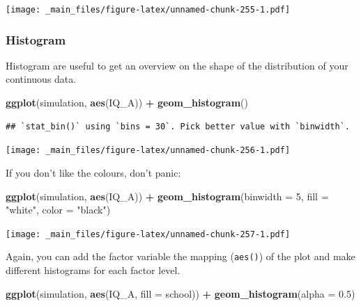 \documentclass[
]{scrartcl}
\newenvironment{Shaded}{\begin{snugshade}}{\end{snugshade}}
\newcommand{\DataTypeTok}[1]{\textcolor[rgb]{0.13,0.29,0.53}{#1}}
\newcommand{\DecValTok}[1]{\textcolor[rgb]{0.00,0.00,0.81}{#1}}
\newcommand{\FloatTok}[1]{\textcolor[rgb]{0.00,0.00,0.81}{#1}}
\newcommand{\KeywordTok}[1]{\textcolor[rgb]{0.13,0.29,0.53}{\textbf{#1}}}
\newcommand{\NormalTok}[1]{#1}
\newcommand{\OperatorTok}[1]{\textcolor[rgb]{0.81,0.36,0.00}{\textbf{#1}}}
\newcommand{\StringTok}[1]{\textcolor[rgb]{0.31,0.60,0.02}{#1}}
\begin{document}
\texttt{[image: \_main\_files/figure-latex/unnamed-chunk-255-1.pdf]}

\hypertarget{histogram}{%
\subsubsection{Histogram}\label{histogram}}

Histogram are useful to get an overview on the shape of the distribution of your continuous data.

\begin{Shaded}
\begin{Highlighting}[]
\KeywordTok{ggplot}\NormalTok{(simulation, }\KeywordTok{aes}\NormalTok{(IQ\_A)) }\OperatorTok{+}
\StringTok{        }\KeywordTok{geom\_histogram}\NormalTok{()}
\end{Highlighting}
\end{Shaded}

\begin{verbatim}
## `stat_bin()` using `bins = 30`. Pick better value with `binwidth`.
\end{verbatim}

\texttt{[image: \_main\_files/figure-latex/unnamed-chunk-256-1.pdf]}

If you don't like the colours, don't panic:

\begin{Shaded}
\begin{Highlighting}[]
\KeywordTok{ggplot}\NormalTok{(simulation, }\KeywordTok{aes}\NormalTok{(IQ\_A)) }\OperatorTok{+}
\StringTok{    }\KeywordTok{geom\_histogram}\NormalTok{(}\DataTypeTok{binwidth =} \DecValTok{5}\NormalTok{, }\DataTypeTok{fill =} \StringTok{"white"}\NormalTok{, }\DataTypeTok{color =} \StringTok{"black"}\NormalTok{)}
\end{Highlighting}
\end{Shaded}

\texttt{[image: \_main\_files/figure-latex/unnamed-chunk-257-1.pdf]}

Again, you can add the factor variable the mapping (\texttt{aes()}) of the plot and make different histograms for each factor level.

\begin{Shaded}
\begin{Highlighting}[]
\KeywordTok{ggplot}\NormalTok{(simulation, }\KeywordTok{aes}\NormalTok{(IQ\_A, }\DataTypeTok{fill =}\NormalTok{ school)) }\OperatorTok{+}
\StringTok{      }\KeywordTok{geom\_histogram}\NormalTok{(}\DataTypeTok{alpha =} \FloatTok{0.5}\NormalTok{)}
\end{Highlighting}
\end{Shaded}
\end{document}

